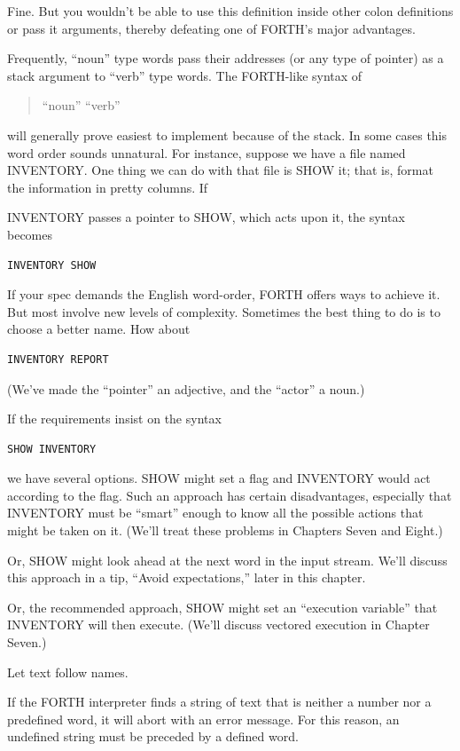 Fine. But you wouldn't be able to use this definition inside other
colon definitions or pass it arguments, thereby defeating one of FORTH's
major advantages.

Frequently, ``noun'' type words pass their addresses (or any type of
pointer) as a stack argument to ``verb'' type words. The FORTH-like syntax of
\begin{quote}
{\sf ``noun'' ``verb''}
\end{quote}
will generally prove easiest to implement because of the stack.
In some cases this word order sounds unnatural. For instance, suppose
we have a file named INVENTORY. One thing we can do with that
file is SHOW it; that is, format the information in pretty columns. If

INVENTORY passes a pointer to SHOW, which acts upon it, the syntax
becomes
\begin{verbatim}
INVENTORY SHOW
\end{verbatim}
If your spec demands the English word-order, FORTH offers ways to
achieve it. But most involve new levels of complexity. Sometimes the
best thing to do is to choose a better name. How about
\begin{verbatim}
INVENTORY REPORT
\end{verbatim}
(We've made the ``pointer'' an adjective, and the ``actor'' a noun.)

If the requirements insist on the syntax
\begin{verbatim}
SHOW INVENTORY
\end{verbatim}
we have several options. SHOW might set a flag and INVENTORY
would act according to the flag. Such an approach has certain disadvantages,
especially that INVENTORY must be ``smart'' enough to
know all the possible actions that might be taken on it. (We'll treat these
problems in Chapters Seven and Eight.)

Or, SHOW might look ahead at the next word in the input stream.
We'll discuss this approach in a tip, ``Avoid expectations,'' later in this
chapter.

Or, the recommended approach, SHOW might set an ``execution
variable'' that INVENTORY will then execute. (We'll discuss vectored
execution in Chapter Seven.)
\begin{tip}
Let text follow names.
\end{tip}
If the FORTH interpreter finds a string of text that is neither a number
nor a predefined word, it will abort with an error message. For this
reason, an undefined string must be preceded by a defined word.

